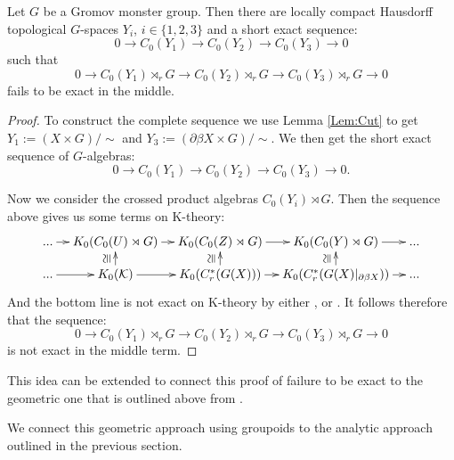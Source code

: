 \begin{theorem}
Let $G$ be a Gromov monster group. Then there are locally compact Hausdorff topological $G$-spaces $Y_{i}$, $i \in \lbrace 1,2,3 \rbrace$ and a short exact sequence:
\begin{equation*}
0 \rightarrow C_{0}(Y_{1}) \rightarrow C_{0}(Y_{2}) \rightarrow C_{0}(Y_{3}) \rightarrow 0
\end{equation*}
such that
\begin{equation*}
0 \rightarrow C_{0}(Y_{1})\rtimes_{r} G \rightarrow C_{0}(Y_{2})\rtimes_{r} G \rightarrow C_{0}(Y_{3})\rtimes_{r} G \rightarrow 0
\end{equation*}
fails to be exact in the middle.
\end{theorem}
\begin{proof}
To construct the complete sequence we use Lemma \ref{Lem:Cut} to get $Y_{1}:= (X \times G)/\sim$ and $Y_{3}:= (\partial\beta X \times G)/\sim$. We then get the short exact sequence of $G$-algebras:
\begin{equation*}
0 \rightarrow C_{0}(Y_{1}) \rightarrow C_{0}(Y_{2}) \rightarrow C_{0}(Y_{3}) \rightarrow 0.
\end{equation*}

Now we consider the crossed product algebras $C_{0}(Y_{i})\rtimes G$. Then the sequence above gives us some terms on K-theory: 
\begin{equation*}
\xymatrix@=1em{...\ar[r] & K_{0}(C_{0}(U)\rtimes G) \ar[r]& K_{0}(C_{0}(Z)\rtimes G) \ar[r]& K_{0}(C_{0}(Y)\rtimes G)\ar[r] & ...\\
...\ar[r] & K_{0}(\mathcal{K}) \ar[r]\ar[u]^{\ucong}& K_{0}(C^{*}_{r}(G(X))) \ar[r]\ar[u]^{\ucong}& K_{0}(C^{*}_{r}(G(X)|_{\partial\beta X})) \ar[r]\ar[u]^{\ucong}& ...}
\end{equation*}
And the bottom line is not exact on K-theory by either \cite{MR1911663}, \cite{explg1} or \cite{mypub1}. It follows therefore that the sequence:
\begin{equation*}
0 \rightarrow C_{0}(Y_{1})\rtimes_{r} G \rightarrow C_{0}(Y_{2})\rtimes_{r} G \rightarrow C_{0}(Y_{3})\rtimes_{r} G \rightarrow 0
\end{equation*}
is not exact in the middle term.
\end{proof}

This idea can be extended to connect this proof of failure to be exact to the geometric one that is outlined above from \cite{higsonpreprint,explg1}. 

We connect this geometric approach using groupoids to the analytic approach outlined in the previous section. 

